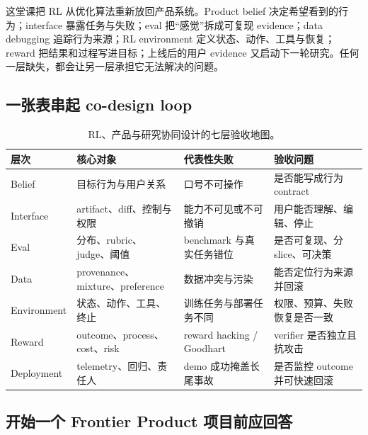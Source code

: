 \documentclass[a4paper]{article}
\begin{document}
这堂课把 RL 从优化算法重新放回产品系统。Product belief 决定希望看到的行为；interface 暴露任务与失败；eval 把“感觉”拆成可复现 evidence；data debugging 追踪行为来源；RL environment 定义状态、动作、工具与恢复；reward 把结果和过程写进目标；上线后的用户 evidence 又启动下一轮研究。任何一层缺失，都会让另一层承担它无法解决的问题。

\subsection{一张表串起 co-design loop}

\begin{table}[H]
\centering
\small
\begin{tabular}{@{}L{0.16\textwidth}L{0.24\textwidth}L{0.27\textwidth}L{0.23\textwidth}@{}}
\toprule
层次 & 核心对象 & 代表性失败 & 验收问题 \\
\midrule
Belief & 目标行为与用户关系 & 口号不可操作 & 是否能写成行为 contract \\
Interface & artifact、diff、控制与权限 & 能力不可见或不可撤销 & 用户能否理解、编辑、停止 \\
Eval & 分布、rubric、judge、阈值 & benchmark 与真实任务错位 & 是否可复现、分 slice、可决策 \\
Data & provenance、mixture、preference & 数据冲突与污染 & 能否定位行为来源并回滚 \\
Environment & 状态、动作、工具、终止 & 训练任务与部署任务不同 & 权限、预算、失败恢复是否一致 \\
Reward & outcome、process、cost、risk & reward hacking / Goodhart & verifier 是否独立且抗攻击 \\
Deployment & telemetry、回归、责任人 & demo 成功掩盖长尾事故 & 是否监控 outcome 并可快速回滚 \\
\bottomrule
\end{tabular}
\caption{RL、产品与研究协同设计的七层验收地图。}
\end{table}

\subsection{开始一个 Frontier Product 项目前应回答}
\end{document}
